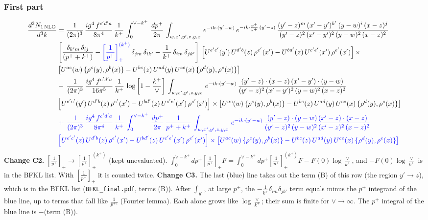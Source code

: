 \documentclass[9pt]{article}
\newcommand{\new}[1]{{\color{blue}#1}}
\newcommand{\nc}{\color{blue}}
\numberwithin{equation}{section}
\begin{document}
 \subsubsection{First part}
 \begin{align}
     \frac{d^{3}N_{1\,\rm NLO}}{d^{3}k} & = \frac{1}{(2\pi)^{3}}\, \frac{ig^{4}\,f^{c'd'a}}{8\pi^{4}}\, \frac{1}{k^{+}}\,\int_{0}^{\vee-k^{+}}\,  \frac{dp^{+}}{2\pi}\, \int_{w,x',y',z,y,x}\, e^{-ik\cdot (y'-w)}\, e^{-ik\cdot \frac{p^{+}}{k^{+}}\,(y'-z)}\,\frac{(y'-z)^{m}\,(x'-y')^{k'}\,(y-w)^{i}\,(x-z)^{j}}{(y'-z)^{2}\,(x'-y')^{2}\,(y-w)^{2}\,(x-z)^{2}}\notag \\ & \left[\frac{\delta_{k'm}\,\delta_{ij}}{(p^{+}+k^{+})}-\new{\left[\frac{1}{p^{+}}\right]_{+}^{(k^{+})}}\,\delta_{jm}\,\delta_{ik'}-\frac{1}{k^{+}}\, \delta_{im}\, \delta_{jk'}\right]\, \left[U^{e'c'}(y')\,U^{d'b}(z)\,\rho^{e'}(x')-U^{bd'}(z)\,U^{c'e'}(x')\,\rho^{e'}(x')\right]\times\notag \\ &  \left[U^{ac}(w)\, \{\rho^{c}(y),\rho^{b}(x)\}-U^{bc}(z)\,U^{ad}(y)\,U^{ce}(x)\,\{\rho^{d}(y),\rho^{e}(x)\}\right]\notag \\ & -\,\frac{1}{(2\pi)^{3}}\, \frac{ig^{4}\,f^{c'd'a}}{16\pi^{5}}\, \frac{1}{k^{+}}\, \log{\left[1-\frac{k^{+}}{\vee}\right]}\, \int_{w,x',y',z,y,x}\, e^{-ik\cdot (y'-w)}\,\frac{(y'-z)\cdot (x-z)\,(x'-y')\cdot (y-w)}{(y'-z)^{2}\,(x'-y')^{2}\,(y-w)^{2}\,(x-z)^{2}}\notag \\ &  \left[U^{e'c'}(y')\,U^{d'b}(z)\,\rho^{e'}(x')-U^{bd'}(z)\,U^{c'e'}(x')\,\rho^{e'}(x')\right]\times  \left[U^{ac}(w)\, \{\rho^{c}(y),\rho^{b}(x)\}-U^{bc}(z)\,U^{ad}(y)\,U^{ce}(x)\,\{\rho^{d}(y),\rho^{e}(x)\}\right]
\notag \\ & \nc +\,\frac{1}{(2\pi)^{3}}\, \frac{ig^{4}\,f^{c'd'a}}{8\pi^{4}}\, \frac{1}{k^{+}}\,\int_{0}^{\vee-k^{+}}\, \frac{dp^{+}}{2\pi}\,\frac{1}{p^{+}+k^{+}}\, \int_{w,x',y',z,y,x}\, e^{-ik\cdot (y'-w)}\,\frac{(y'-z)\cdot (y-w)\,(x'-z)\cdot (x-z)}{(y'-z)^{2}\,(y-w)^{2}\,(x'-z)^{2}\,(x-z)^{2}}\notag \\ & \nc \left[U^{e'c'}(z)\,U^{d'b}(z)\,\rho^{e'}(x')-U^{bd'}(z)\,U^{c'e'}(x')\,\rho^{e'}(x')\right]\times\left[U^{ac}(w)\, \{\rho^{c}(y),\rho^{b}(x)\}-U^{bc}(z)\,U^{ad}(y)\,U^{ce}(x)\,\{\rho^{d}(y),\rho^{e}(x)\}\right]
\end{align}
\new{\textbf{Change C2.} $\left[\frac{1}{p^+}\right]_+\to\left[\frac{1}{p^+}\right]_+^{(k^+)}$ (kept unevaluated). $\int_0^{\vee-k^+}dp^+\left[\frac{1}{p^+}\right]_+F=\int_0^{\vee-k^+}dp^+\left[\frac{1}{p^+}\right]_+^{(k^+)}F-F(0)\log\frac{\vee}{k^+}$, and $-F(0)\log\frac{\vee}{k^+}$ is in the BFKL list. With $\left[\frac{1}{p^+}\right]_+$ it is counted twice. \textbf{Change C3.} The last (blue) line takes out the term (B) of this row (the region $y'\to z$), which is in the BFKL list (\texttt{BFKL\_final.pdf}, terms (B)). After $\int_{y'}$, at large $p^+$, the $-\frac{1}{k^+}\delta_{im}\delta_{jk'}$ term equals minus the $p^+$ integrand of the blue line, up to terms that fall like $\frac{1}{p^{+2}}$ (Fourier lemma). Each alone grows like $\log\frac{\vee}{k^+}$; their sum is finite for $\vee\to\infty$. The $p^+$ integral of the blue line is $-$(term (B)).}
\end{document}
